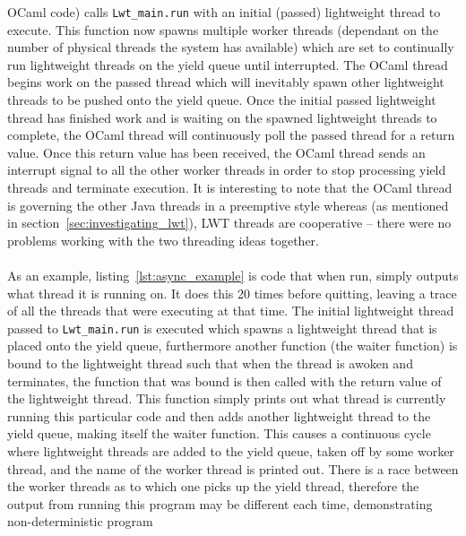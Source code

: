 \documentclass[12pt,twoside,notitlepage]{report}
\begin{document}
OCaml code) calls {\tt Lwt\_main.run} with an initial (passed) lightweight thread to execute. This function now spawns multiple worker threads (dependant on the number of physical threads the system has available) which are set
to continually run lightweight threads on the yield queue until interrupted. The OCaml thread begins work on the passed thread which will inevitably spawn other lightweight threads to be pushed onto the yield queue. Once the initial
passed lightweight thread has finished work and is waiting on the spawned lightweight threads to complete, the OCaml thread will continuously poll the passed thread for a return value. Once this return value has been received, the OCaml thread
sends an interrupt signal to all the other worker threads in order to stop processing yield threads and terminate execution.  It is interesting to note that the OCaml thread is governing the other Java threads in a preemptive style
whereas (as mentioned in section~\ref{sec:investigating_lwt}), LWT threads are cooperative -- there were no problems working with the two threading ideas together.
\hfill\\

\hfill\\
%
%
As an example, listing~\ref{lst:async_example} is code that when run, simply outputs what thread it is running on. It does this 20 times before quitting, leaving a trace of all the threads that
were executing at that time. The initial lightweight thread passed to {\tt Lwt\_main.run} is executed which spawns a lightweight thread that is placed onto the yield queue, furthermore another function (the waiter function) is bound
to the lightweight thread such that when the thread is awoken and terminates, the function that was bound is then called with the return value of the lightweight thread. This function simply prints out what thread is currently running this
particular code and then adds another lightweight thread to the yield queue, making itself the waiter function. This causes a continuous cycle where lightweight threads are added to the yield queue, taken off by some worker thread, and the name of the worker
thread is printed out. There is a race between the worker threads as to which one picks up the yield thread, therefore the output from running this program may be different each time, demonstrating non-deterministic program
\end{document}
